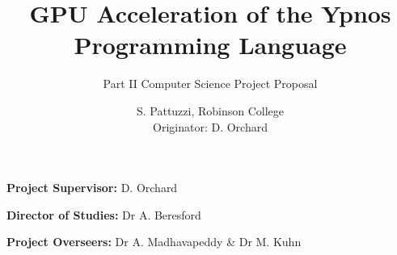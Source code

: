 \documentclass[12pt,a4]{scrartcl}
\begin{document}
\subtitle{Part II Computer Science Project Proposal}
\title{GPU Acceleration of the Ypnos Programming Language}
\author{
S. Pattuzzi, Robinson College\\
Originator: D. Orchard
}

\maketitle

\noindent
\textbf{Project Supervisor:} D. Orchard
\vspace{0.2in}

\noindent
\textbf{Director of Studies:} Dr A. Beresford
\vspace{0.2in}
\noindent
 
\noindent
\textbf{Project Overseers:} Dr A. Madhavapeddy \& Dr M. Kuhn


\end{document}
